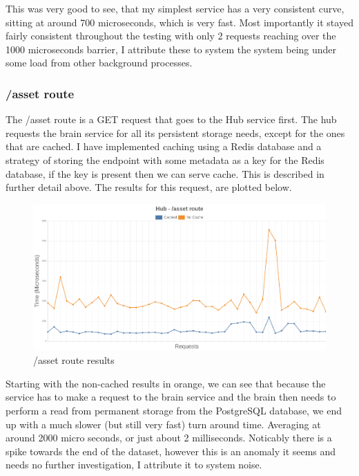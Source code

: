 \documentclass[titlepage]{article}
\begin{document}
This was very good to see, that my simplest service has a very consistent curve, sitting at around 700 microseconds, which is very fast. Most importantly it stayed fairly consistent throughout the testing with only 2 requests reaching over the 1000 microseconds barrier, I attribute these to system the system being under some load from other background processes.

\pagebreak
\subsubsection{/asset route}
The /asset route is a GET request that goes to the Hub service first. The hub requests the brain service for all its persistent storage needs, except for the ones that are cached. I have implemented caching using a Redis database and a strategy of storing the endpoint with some metadata as a key for the Redis database, if the key is present then we can serve cache. This is described in further detail above. The results for this request, are plotted below.

\begin{figure}[h!]
\includegraphics[width=\textwidth]{../results/asset.png}
  \caption{/asset route results}
\end{figure}

Starting with the non-cached results in orange, we can see that because the service has to make a request to the brain service and the brain then needs to perform a read from permanent storage from the PostgreSQL database, we end up with a much slower (but still very fast) turn around time. Averaging at around 2000 micro seconds, or just about 2 milliseconds. Noticably there is a spike towards the end of the dataset, however this is an anomaly it seems and needs no further investigation, I attribute it to system noise. \\
\end{document}
